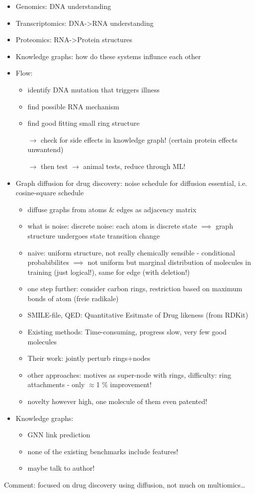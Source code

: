 \documentclass[a4paper]{article}
\begin{document}
\begin{itemize}
    \item Genomics: DNA understanding
    \item Transcriptomics: DNA->RNA understanding
    \item Proteomics: RNA->Protein structures
    \item Knowledge graphs: how do these systems influnce each other
    \item Flow:
          \begin{itemize}
              \item identify DNA mutation that triggers illness
              \item find possible RNA mechanism
              \item find good fitting small ring structure
              \item[$\rightarrow$] check for side effects in knowledge graph! (certain protein effects unwantend)
              \item[$\rightarrow$] then test  $\rightarrow$ animal tests, reduce through ML!
          \end{itemize}
    \item Graph diffusion for drug discovery: noise schedule for diffusion essential, i.e. cosine-square schedule
          \begin{itemize}
              \item diffuse graphs from atoms \& edges as adjacency matrix
              \item what is noise: discrete noise: each atom is discrete state $\implies$ graph structure undergoes state transition change
              \item naive: uniform structure, not really chemically sensible - conditional probabibilites $\implies$ not uniform but marginal distribution of molecules in training (just logical!), same for edge (with deletion!)
              \item one step further: consider carbon rings, restriction based on maximum bonds of atom (freie radikale)
              \item SMILE-file, QED: Quantitative Esitmate of Drug likeness (from RDKit)
              \item Existing methods: Time-consuming, progress slow, very few good molecules
              \item Their work: jointly perturb rings+nodes
              \item other approaches: motives as super-node with rings, difficulty: ring attachments - only $\approx$1 \% improvement!
              \item novelty however high, one molecule of them even patented!
          \end{itemize}
\item Knowledge graphs:
\begin{itemize}
    \item GNN link prediction
    \item none of the existing benchmarks include features!
    \item maybe talk to author!
\end{itemize}
\end{itemize}
Comment: focused on drug discovery using diffusion, not much on multiomics\dots
\end{document}
